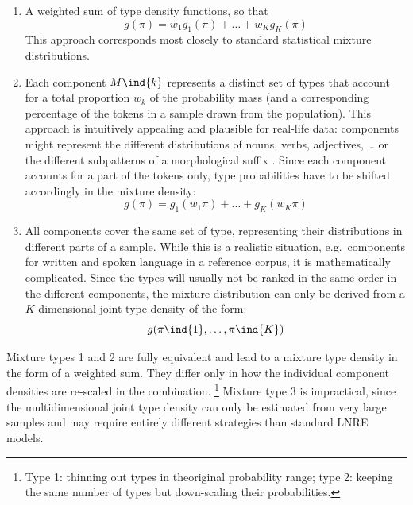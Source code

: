 \documentclass[a4paper]{article}
\begin{document}
\begin{enumerate}
\item A weighted sum of type density functions, so that
  \begin{equation}
    \label{eq:models:mixtures:type1}
    g(\pi) = w_1 g_1(\pi) + \ldots + w_K g_K(\pi)
  \end{equation}
  This approach corresponds most closely to standard statistical
  mixture distributions.
\item Each component $M\ind{k}$ represents a distinct set of types that
  account for a total proportion $w_k$ of the probability mass (and a
  corresponding percentage of the tokens in a sample drawn from the
  population). This approach is intuitively appealing and plausible for
  real-life data: components might represent the different distributions of
  nouns, verbs, adjectives, \ldots{} or the different subpatterns of a
  morphological suffix \citep[cf.][Sec.~4.3]{Baayen:01}.  Since each
  component accounts for a part of the tokens only, type probabilities have
  to be shifted accordingly in the mixture density:
  \begin{equation}
    \label{eq:models:mixtures:type2}
    g(\pi) = g_1(w_1 \pi) + \ldots + g_K(w_K \pi)
  \end{equation}
\item All components cover the same set of type, representing their
  distributions in different parts of a sample.  While this is a realistic
  situation, e.g.\ components for written and spoken language in a reference
  corpus, it is mathematically complicated. Since the types will usually
  not be ranked in the same order in the different components, the
  mixture distribution can only be derived from a $K$-dimensional joint type
  density of the form:
  \begin{equation}
    \label{eq:models:mixtures:type3}
    g(\pi\ind{1}, \ldots, \pi\ind{K})
  \end{equation}
\end{enumerate}

Mixture types 1 and 2 are fully equivalent and lead to a mixture type density
in the form of a weighted sum.  They differ only in how the individual
component densities are re-scaled in the combination.%
\footnote{Type 1: thinning out types in theoriginal probability range; type 2:
  keeping the same number of types but down-scaling their probabilities.} %
Mixture type 3 is impractical, since the multidimensional joint type density
can only be estimated from very large samples and may require entirely
different strategies than standard LNRE models.
\end{document}
